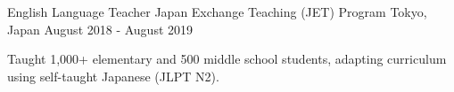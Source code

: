 \begin{cventries}
  \cventry
    {English Language Teacher}
    {Japan Exchange Teaching (JET) Program}
    {Tokyo, Japan}
    {August 2018 - August 2019}
    {
      \begin{cvitems}
        \item {Taught 1,000+ elementary and 500 middle school students, adapting curriculum using self-taught Japanese (JLPT N2).}
      \end{cvitems}
    }

\end{cventries}

